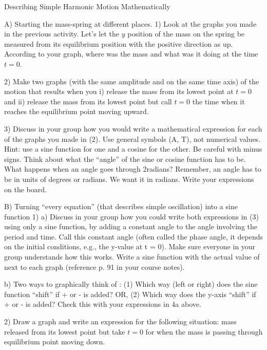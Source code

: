 Describing Simple Harmonic Motion Mathematically

A) Starting the mass-spring at different places.
1)	Look at the graphs you made in the previous activity.  Let's let the $y$ position of the mass on the spring be measured from its equilibrium position with the positive direction as up.  According to your graph, where was the mass and what was it doing at the time $t = 0$.

2)	Make two graphs (with the same amplitude and on the same time axis) of the motion that results when you i) release the mass from its lowest point at $t = 0$ and ii) release the mass from its lowest point but call $t = 0$ the time when it reaches the equilibrium point moving upward.


3)	Discuss in your group how you would write a mathematical expression for each of the graphs you made in (2).   Use general symbols (A, T), not numerical values.  Hint: use a sine function for one and a cosine for the other.  Be careful with minus signs.  Think about what the ``angle'' of the sine or cosine function has to be.  What happens when an angle goes through 2\pi radians?  Remember, an angle has to be in units of degrees or radians.  We want it in radians.   Write your expressions on the board.

\WCD 

B) Turning ``every equation'' (that describes simple oscillation) into a sine function
1)	a)	Discuss in your group how you could write both expressions in (3) using only a sine function, by adding a constant angle to the angle involving the period and time.  Call this constant angle \phi (often called the phase angle, it depends on the initial conditions, e.g., the y-value at t = 0).  Make sure everyone in your group understands how this works.  Write a sine function with the actual value of \phi next to each graph (reference p. 91 in your course notes).


b)	Two ways to graphically think of \phi: (1) Which way (left or right) does the sine function ``shift'' if + or - \phi is added?  OR, (2) Which way does the y-axis ``shift'' if + or - \phi is added?  Check this with your expressions in 4a above.

2)	Draw a graph and write an expression for the following situation: mass released from its lowest point but take $t = 0$ for when the mass is passing through equilibrium point moving down.

\WCD

